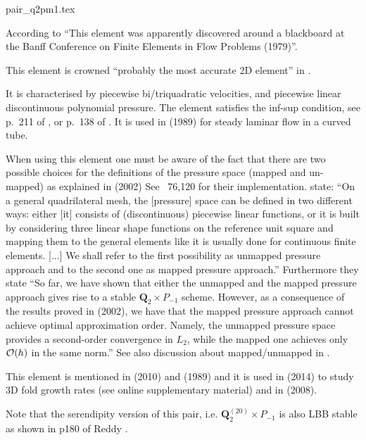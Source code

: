 \begin{flushright} {\tiny {\color{gray} pair\_q2pm1.tex}} \end{flushright}

According to \textcite{bobf08} ``This element was apparently discovered 
around a blackboard at the Banff Conference on Finite Elements in Flow Problems (1979)''.

\begin{center}

\end{center}

This element is crowned ``probably the most accurate 2D element''
in \textcite{grsa}.

It is characterised by piecewise bi/triquadratic velocities, 
and piecewise linear discontinuous polynomial pressure. 
The element satisfies the inf-sup condition, see p.~211 of \textcite{hugh}, or 
p.~138 of \textcite{elsw}.
It is used in \textcite{vavs89} (1989) for steady laminar flow in a curved tube. 

When using this element one must be aware of the fact that there are 
two possible choices for the definitions of the pressure space (mapped and un-mapped) as explained
in \textcite{boga02} (2002) 
See \stone~76,120 for their implementation.
\textcite{bobf08} state: ``On a general quadrilateral mesh, the [pressure] space 
can be defined in two different ways: either [it] 
consists of (discontinuous) piecewise linear functions, or it is built
by considering three linear shape functions on the reference unit square and mapping
them to the general elements like it is usually done for continuous finite elements. [...]
We shall refer to the first possibility as unmapped pressure approach and to the
second one as mapped pressure approach.''
Furthermore they state ``So far, we have shown that either the unmapped and the mapped pressure 
approach gives rise to a stable ${\bm Q}_2\times P_{-1}$ scheme. However, as a consequence of the
results proved in \textcite{arbf02} (2002), we have that the mapped pressure approach cannot achieve 
optimal approximation order. Namely, the unmapped pressure space provides a second-order convergence 
in $L_2$, while the mapped one achieves only ${\cal O}(h)$ in the same norm.''
See also discussion about mapped/unmapped in \textcite{bobf13}.

This element is mentioned in \textcite{kaus10} (2010) and \textcite{pefc89} (1989) 
and it is used in \textcite{freh14} (2014) to study 3D fold growth rates 
(see online supplementary material) and in \textcite{schm08} (2008).

Note that the serendipity version of this pair, i.e. ${\bm Q}_2^{(20)}\times P_{-1}$ is also LBB stable
as shown in p180 of Reddy \cite{reddybook2}.


